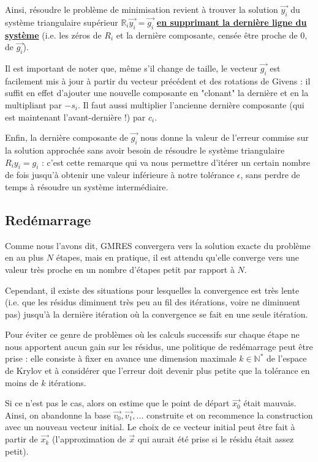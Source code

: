 \documentclass[11pt,a4paper,oneside]{memoir}
\newcommand{\R}{\mathbb{R}}	\newcommand{\Q}{\mathbb{Q}}	\newcommand{\C}{\mathbb{C}}
\newcommand{\N}{\mathbb{N}}	\newcommand{\Z}{\mathbb{Z}}
\theoremstyle{definition}
\theoremstyle{remark}
\theoremstyle{plain}
\begin{document}
Ainsi, résoudre le problème de minimisation revient à trouver la solution $\vec{y_i}$ du système triangulaire supérieur $\R_i \vec{y_i} = \vec{g_i}$ \underline{\textbf{en supprimant la dernière ligne du système}} (i.e. les zéros de $R_i$ et la dernière composante, censée être proche de 0, de $\vec{g_i}$).

Il est important de noter que, même s'il change de taille, le vecteur $\vec{g_i}$ est facilement mis à jour à partir du vecteur précédent et des rotations de Givens : il suffit en effet d'ajouter une nouvelle composante en "clonant" la dernière et en la multipliant par $-s_i$. Il faut aussi multiplier l'ancienne dernière composante (qui est maintenant l'avant-dernière !) par $c_i$.\medskip

Enfin, la dernière composante de $\vec{g_i}$ nous donne la valeur de l'erreur commise sur la solution approchée sans avoir besoin de résoudre le système triangulaire $R_i y_i = g_i$ : c'est cette remarque qui va nous permettre d'itérer un certain nombre de fois jusqu'à obtenir une valeur inférieure à notre tolérance $\epsilon$, sans perdre de temps à résoudre un système intermédiaire.

\subsection{Redémarrage}

Comme nous l'avons dit, GMRES convergera vers la solution exacte du problème en au plus $N$ étapes, mais en pratique, il est attendu qu'elle converge vers une valeur très proche en un nombre d'étapes petit par rapport à $N$.

Cependant, il existe des situations pour lesquelles la convergence est très lente (i.e. que les résidus diminuent très peu au fil des itérations, voire ne diminuent pas) jusqu'à la dernière itération où la convergence se fait en une seule itération.

Pour éviter ce genre de problèmes où les calculs successifs sur chaque étape ne nous apportent aucun gain sur les résidus, une politique de redémarrage peut être prise : elle consiste à fixer en avance une dimension maximale $k \in \N^*$ de l'espace de Krylov et à considérer que l'erreur doit devenir plus petite que la tolérance en moins de $k$ itérations.

Si ce n'est pas le cas, alors on estime que le point de départ $\vec{x_0}$ était mauvais. Ainsi, on abandonne la base $\vec{v_0}, \vec{v_1}, ...$ construite et on recommence la construction avec un nouveau vecteur initial. Le choix de ce vecteur initial peut être fait à partir de $\vec{x_k}$ (l'approximation de $\vec{x}$ qui aurait été prise si le résidu était assez petit).\bigskip
\end{document}
